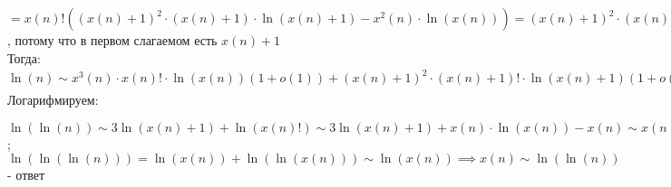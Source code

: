 \documentclass[
    11pt,
    a4paper
]{extarticle}
\begin{document}
$=x(n)!((x(n)+1)^2\cdot(x(n)+1)\cdot\ln(x(n)+1)-x^2(n){\cdot}\ln(x(n)))=(x(n)+1)^2\cdot(x(n)+1)!\cdot\ln(x(n)+1)(1+o(1))$, потому что в первом слагаемом есть $x(n)+1$\\

Тогда:\\

$\ln(n){\sim}x^3(n){\cdot}x(n)!\cdot\ln(x(n))(1+o(1))+(x(n)+1)^2\cdot(x(n)+1)!\cdot\ln(x(n)+1)(1+o(1))=x(n)!(1+o(1))(x^3(n)\cdot\ln(x(n))+(x(n)+1)^3\cdot\ln(x(n)+1)){\sim}(x(n)+1)^3{\cdot}x(n)!{\cdot}\ln(x(n))$\\

Логарифмируем:

$\ln(\ln(n)) \sim 3\ln(x(n)+1)+\ln(x(n)!)\sim3\ln(x(n)+1)+x(n)\cdot\ln(x(n))-x(n)\sim x(n)\cdot\ln(x(n))$;\\

$\ln(\ln(\ln(n)))=\ln(x(n))+\ln(\ln(x(n)))\sim\ln(x(n))\implies x(n) \sim \ln(\ln(n))$ - ответ
\end{document}
